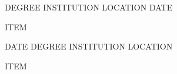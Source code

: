 
\begin{cventries}
	
	\cventry
	{DEGREE} %
	{INSTITUTION} %
	{LOCATION} %
	{DATE} %
	{
		\begin{cvitems} %
			\item {ITEM}
		\end{cvitems}
	}
	
	\cventry
	{DATE} %
	{DEGREE} %
	{INSTITUTION} %
	{LOCATION} %
	{
		\begin{cvitems} %
			\item {ITEM}
		\end{cvitems}
	}
	
\end{cventries}